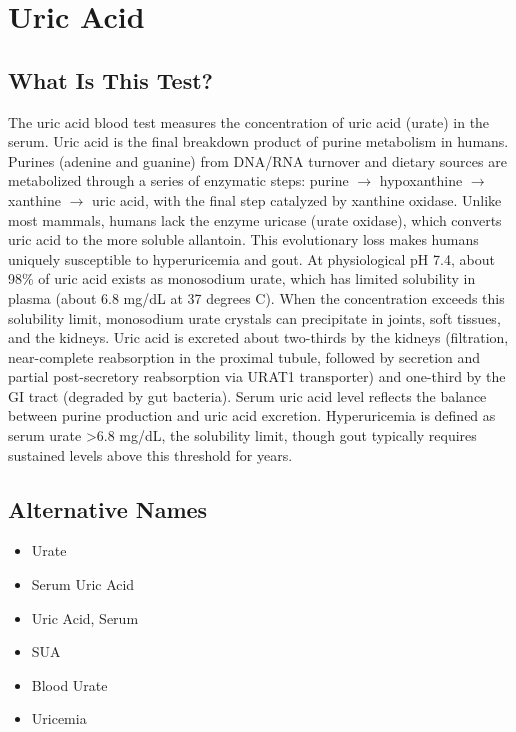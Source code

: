 \chapter{Uric Acid}

\section*{What Is This Test?}
The uric acid blood test measures the concentration of uric acid (urate) in the serum. Uric acid is the final breakdown product of purine metabolism in humans. Purines (adenine and guanine) from DNA/RNA turnover and dietary sources are metabolized through a series of enzymatic steps: purine $\rightarrow$ hypoxanthine $\rightarrow$ xanthine $\rightarrow$ uric acid, with the final step catalyzed by xanthine oxidase. Unlike most mammals, humans lack the enzyme uricase (urate oxidase), which converts uric acid to the more soluble allantoin. This evolutionary loss makes humans uniquely susceptible to hyperuricemia and gout. At physiological pH 7.4, about 98\% of uric acid exists as monosodium urate, which has limited solubility in plasma (about 6.8 mg/dL at 37 degrees C). When the concentration exceeds this solubility limit, monosodium urate crystals can precipitate in joints, soft tissues, and the kidneys. Uric acid is excreted about two-thirds by the kidneys (filtration, near-complete reabsorption in the proximal tubule, followed by secretion and partial post-secretory reabsorption via URAT1 transporter) and one-third by the GI tract (degraded by gut bacteria). Serum uric acid level reflects the balance between purine production and uric acid excretion. Hyperuricemia is defined as serum urate >6.8 mg/dL, the solubility limit, though gout typically requires sustained levels above this threshold for years.

\section*{Alternative Names}
\begin{itemize}
  \item Urate
  \item Serum Uric Acid
  \item Uric Acid, Serum
  \item SUA
  \item Blood Urate
  \item Uricemia
\end{itemize}
